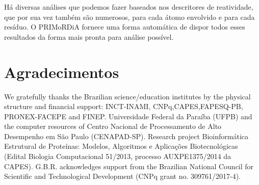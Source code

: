 \documentclass[a4paper,11pt]{refart}
\begin{document}
  
	 Há diversas análises que podemos fazer baseados nos descritores de reatividade, que por sua vez também são numerosos, para cada átomo envolvido e para cada resíduo. O PRIMoRDiA fornece uma forma automática de dispor todos esses resultados da forma mais pronta para análise possível. 
	
	
	\newpage
	\section*{Agradecimentos}
	
	We gratefully thanks the Brazilian science/education institutes by the physical structure and financial support: INCT-INAMI, CNPq,CAPES,FAPESQ-PB, PRONEX-FACEPE and FINEP. Universidade Federal da Paraíba (UFPB) and the computer resources of Centro Nacional de Processamento de Alto Desempenho em São Paulo (CENAPAD-SP). 		
	Research project Bioinformática Estrutural de Proteínas: Modelos, Algoritmos e Aplicações Biotecnológicas (Edital Biologia Computacional 51/2013, processo AUXPE1375/2014 da CAPES). G.B.R. acknowledges support from the Brazilian National Council for Scientific and Technological Development (CNPq grant no. 309761/2017-4).
	
	
	
	
	\newpage
	
	
	
\end{document}

